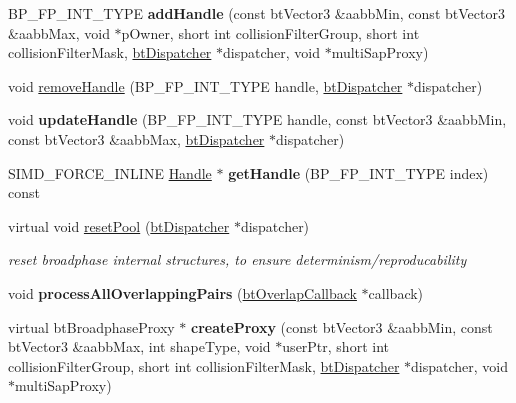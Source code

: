 \begin{DoxyCompactItemize}
B\+P\+\_\+\+F\+P\+\_\+\+I\+N\+T\+\_\+\+T\+Y\+PE {\bfseries add\+Handle} (const bt\+Vector3 \&aabb\+Min, const bt\+Vector3 \&aabb\+Max, void $\ast$p\+Owner, short int collision\+Filter\+Group, short int collision\+Filter\+Mask, \hyperlink{classbtDispatcher}{bt\+Dispatcher} $\ast$dispatcher, void $\ast$multi\+Sap\+Proxy)
\item 
void \hyperlink{classbtAxisSweep3Internal_a4e26f4f8acf63f26451f6396223001bb}{remove\+Handle} (B\+P\+\_\+\+F\+P\+\_\+\+I\+N\+T\+\_\+\+T\+Y\+PE handle, \hyperlink{classbtDispatcher}{bt\+Dispatcher} $\ast$dispatcher)
\item 
\mbox{\label{classbtAxisSweep3Internal_ac9852514d20572ebdde3e72215b09410}} 
void {\bfseries update\+Handle} (B\+P\+\_\+\+F\+P\+\_\+\+I\+N\+T\+\_\+\+T\+Y\+PE handle, const bt\+Vector3 \&aabb\+Min, const bt\+Vector3 \&aabb\+Max, \hyperlink{classbtDispatcher}{bt\+Dispatcher} $\ast$dispatcher)
\item 
\mbox{\label{classbtAxisSweep3Internal_a7b5d56d6783b872714158a0f90cbd1da}} 
S\+I\+M\+D\+\_\+\+F\+O\+R\+C\+E\+\_\+\+I\+N\+L\+I\+NE \hyperlink{classbtAxisSweep3Internal_1_1Handle}{Handle} $\ast$ {\bfseries get\+Handle} (B\+P\+\_\+\+F\+P\+\_\+\+I\+N\+T\+\_\+\+T\+Y\+PE index) const
\item 
\mbox{\label{classbtAxisSweep3Internal_aeecfcc066ca77ec8b9bf2c8d422716ee}} 
virtual void \hyperlink{classbtAxisSweep3Internal_aeecfcc066ca77ec8b9bf2c8d422716ee}{reset\+Pool} (\hyperlink{classbtDispatcher}{bt\+Dispatcher} $\ast$dispatcher)
\begin{DoxyCompactList}\small\item\em reset broadphase internal structures, to ensure determinism/reproducability \end{DoxyCompactList}\item 
\mbox{\label{classbtAxisSweep3Internal_adc81ed36fde6cccd3e9fcb2ec3bc759c}} 
void {\bfseries process\+All\+Overlapping\+Pairs} (\hyperlink{structbtOverlapCallback}{bt\+Overlap\+Callback} $\ast$callback)
\item 
\mbox{\label{classbtAxisSweep3Internal_aa640bd232bae128a3551acbf2cb01116}} 
virtual bt\+Broadphase\+Proxy $\ast$ {\bfseries create\+Proxy} (const bt\+Vector3 \&aabb\+Min, const bt\+Vector3 \&aabb\+Max, int shape\+Type, void $\ast$user\+Ptr, short int collision\+Filter\+Group, short int collision\+Filter\+Mask, \hyperlink{classbtDispatcher}{bt\+Dispatcher} $\ast$dispatcher, void $\ast$multi\+Sap\+Proxy)

\end{DoxyCompactItemize}
